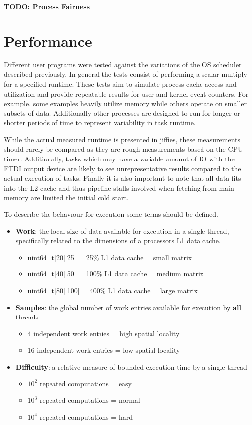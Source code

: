 \documentclass[11pt]{article}
\begin{document}
\textbf{TODO: Process Fairness}


\section{Performance}
\label{sec:performance}
Different user programs were tested against the variations of the OS scheduler described previously.  In general the tests consist of performing a scalar multiply for a specified runtime.  These tests aim to simulate process cache access and utilization and provide repeatable results for user and kernel event counters.  For example, some examples heavily utilize memory while others operate on smaller subsets of data.  Additionally other processes are designed to run for longer or shorter periods of time to represent variability in task runtime.

While the actual measured runtime is presented in jiffies, these measurements should rarely be compared as they are rough measurements based on the CPU timer.  Additionally, tasks which may have a variable amount of IO with the FTDI output device are likely to see unrepresentative results compared to the actual execution of tasks.  Finally it is also important to note that all data fits into the L2 cache and thus pipeline stalls involved when fetching from main memory are limited the initial cold start.

To describe the behaviour for execution some terms should be defined.
\begin{itemize}
	\item \textbf{Work}: the local size of data available for execution in a single thread, specifically related to the dimensions of a processors L1 data cache.
	\begin{itemize}
		\item uint64\_t[20][25] 	= 25\% L1 data cache	= small matrix
		\item uint64\_t[40][50] 	= 100\% L1 data cache	= medium matrix
		\item uint64\_t[80][100] 	= 400\% L1 data cache	= large matrix
	\end{itemize}
	\item \textbf{Samples}: the global number of work entries available for execution by \textbf{all} threads
	\begin{itemize}
		\item 4 independent work entries 	= high spatial locality
		\item 16 independent work entries 	= low spatial locality
	\end{itemize}
	\item \textbf{Difficulty}: a relative measure of bounded execution time by a single thread
	\begin{itemize}
		\item $10^2$ repeated computations = easy
		\item $10^3$ repeated computations = normal
		\item $10^4$ repeated computations = hard
	\end{itemize}
\end{itemize}
\end{document}
